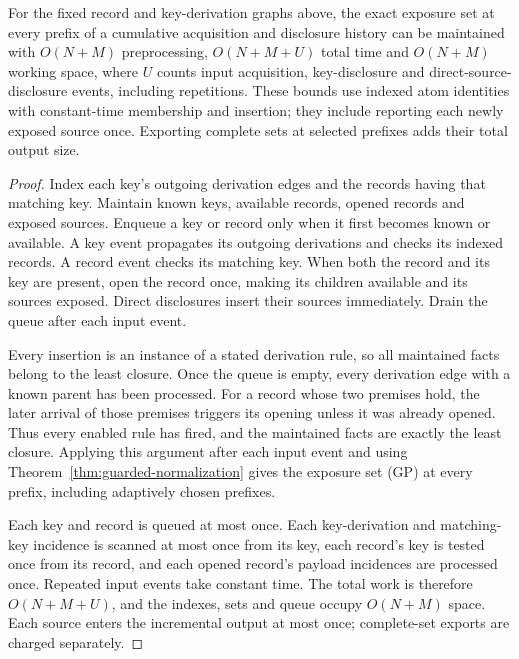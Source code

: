 \begin{proposition}
\label{prop:guarded-worklist}
For the fixed record and key-derivation graphs above, the exact exposure
set at every prefix of a cumulative acquisition and disclosure history
can be maintained with $O(N+M)$ preprocessing, $O(N+M+U)$ total time and
$O(N+M)$ working space, where $U$ counts input acquisition, key-disclosure
and direct-source-disclosure events, including repetitions. These bounds
use indexed atom identities with constant-time membership and insertion;
they include reporting each newly exposed source once. Exporting complete
sets at selected prefixes adds their total output size.
\end{proposition}
\begin{proof}
Index each key's outgoing derivation edges and the records having that
matching key. Maintain known keys, available records, opened records and
exposed sources. Enqueue a key or record only when it first becomes known
or available. A key event propagates its outgoing derivations and checks
its indexed records. A record event checks its matching key. When both
the record and its key are present, open the record once, making its
children available and its sources exposed. Direct disclosures insert
their sources immediately. Drain the queue after each input event.

Every insertion is an instance of a stated derivation rule, so all
maintained facts belong to the least closure. Once the queue is empty, every
derivation edge with a known parent has been processed. For a record
whose two premises hold, the later arrival of those premises triggers
its opening unless it was already opened. Thus every enabled rule has
fired, and the maintained facts are exactly the least closure. Applying
this argument after each input event and using
Theorem~\ref{thm:guarded-normalization} gives the exposure set (GP) at
every prefix, including adaptively chosen prefixes.

Each key and record is queued at most once. Each key-derivation and
matching-key incidence is scanned at most once from its key, each
record's key is tested once from its record, and each opened record's
payload incidences are processed once. Repeated input events take
constant time. The total work is therefore $O(N+M+U)$, and the indexes,
sets and queue occupy $O(N+M)$ space. Each source enters the incremental
output at most once; complete-set exports are charged separately.
\end{proof}

